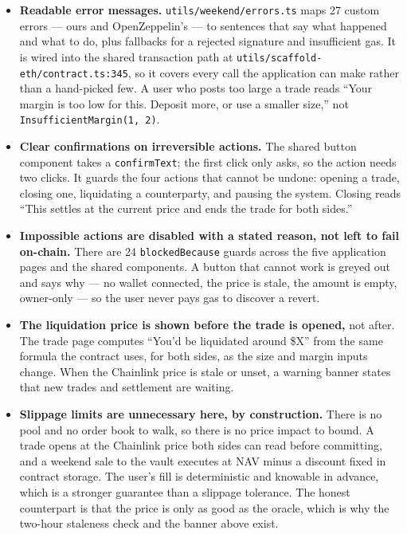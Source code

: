 \documentclass[11pt,a4paper]{article}
\begin{document}
\begin{itemize}
  \item \textbf{Readable error messages.} \texttt{utils/weekend/errors.ts}
  maps 27 custom errors — ours and OpenZeppelin's — to sentences that say what happened and what to
  do, plus fallbacks for a rejected signature and insufficient gas. It is wired into the shared
  transaction path at \texttt{utils/scaffold-eth/contract.ts:345}, so it covers every call the
  application can make rather than a hand-picked few. A user who posts too large a trade reads
  ``Your margin is too low for this. Deposit more, or use a smaller size,'' not
  \texttt{InsufficientMargin(1, 2)}.
  \item \textbf{Clear confirmations on irreversible actions.} The shared button component takes a
  \texttt{confirmText}; the first click only asks, so the action needs two clicks. It guards the
  four actions that cannot be undone: opening a trade, closing one, liquidating a counterparty,
  and pausing the system. Closing reads
  ``This settles at the current price and ends the trade for both sides.''
  \item \textbf{Impossible actions are disabled with a stated reason, not left to fail on-chain.}
  There are 24 \texttt{blockedBecause} guards across the five application pages and the shared
  components. A button that cannot work is greyed out and says why — no wallet connected, the price
  is stale, the amount is empty, owner-only — so the user never pays gas to discover a revert.
  \item \textbf{The liquidation price is shown before the trade is opened,} not after. The trade
  page computes ``You'd be liquidated around \$X'' from the same formula the contract uses, for both
  sides, as the size and margin inputs change. When the Chainlink price is stale or unset, a warning
  banner states that new trades and settlement are waiting.
  \item \textbf{Slippage limits are unnecessary here, by construction.} There is no pool and no
  order book to walk, so there is no price impact to bound. A trade opens at the Chainlink price both
  sides can read before committing, and a weekend sale to the vault executes at NAV minus a discount
  fixed in contract storage. The user's fill is deterministic and knowable in advance, which is a
  stronger guarantee than a slippage tolerance. The honest counterpart is that the price is only as
  good as the oracle, which is why the two-hour staleness check and the banner above exist.
\end{itemize}
\end{document}
